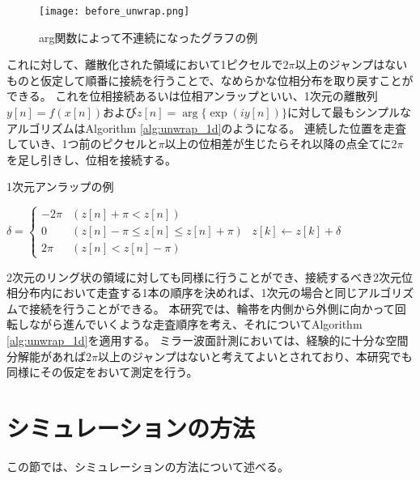 \begin{figure}[ht]
\centering
\texttt{[image: before\_unwrap.png]}
\caption{arg関数によって不連続になったグラフの例}
\label{fig:wrapped_graph_example}
\end{figure}

これに対して、離散化された領域において1ピクセルで$2\pi$以上のジャンプはないものと仮定して順番に接続を行うことで、なめらかな位相分布を取り戻すことができる。
これを位相接続あるいは位相アンラップといい、1次元の離散列$y[n] = f(x[n])$および$z[n]=\arg\{\exp(iy[n])\}$に対して最もシンプルなアルゴリズムはAlgorithm \ref{alg:unwrap_1d}のようになる。
連続した位置を走査していき、1つ前のピクセルと$\pi$以上の位相差が生じたらそれ以降の点全てに$2\pi$を足し引きし、位相を接続する。

\begin{algorithm}                      
\caption{1次元アンラップの例}         
\label{alg:unwrap_1d}                          
\begin{algorithmic}
        \STATE $\delta = \begin{cases}
                -2 \pi & (z[n] + \pi < z[n]) \\
                0 & (z[n] - \pi \leq z[n] \leq z[n] + \pi) \\
                2 \pi & (z[n] < z[n] - \pi)
            \end{cases}$
            \STATE $z[k] \leftarrow z[k] + \delta$
        \ENDFOR
    \ENDFOR
\end{algorithmic}
\end{algorithm}

2次元のリング状の領域に対しても同様に行うことができ、接続するべき2次元位相分布内において走査する1本の順序を決めれば、1次元の場合と同じアルゴリズムで接続を行うことができる。
本研究では、輪帯を内側から外側に向かって回転しながら進んでいくような走査順序を考え、それについてAlgorithm \ref{alg:unwrap_1d}を適用する。
ミラー波面計測においては、経験的に十分な空間分解能があれば$2\pi$以上のジャンプはないと考えてよいとされており、本研究でも同様にその仮定をおいて測定を行う。

\clearpage
\newpage



\section{シミュレーションの方法}
この節では、シミュレーションの方法について述べる。


